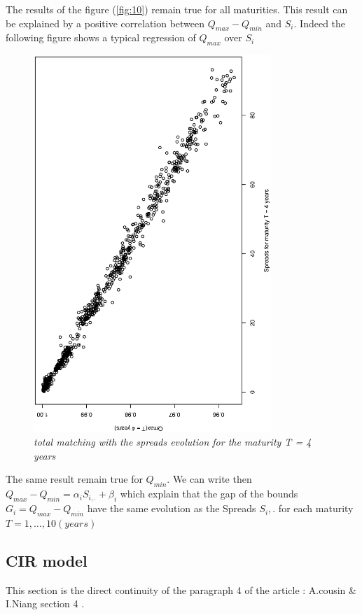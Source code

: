 The results  of the figure (\ref{fig:10})  remain true for all  maturities. This
result can be explained by  a positive correlation between $Q_{max}-Q_{min}$ and
$S_i$. Indeed the following figure shows a typical regression of $Q_{max}$ over $S_i$

\begin{figure}[H]
  \centering
  \includegraphics[angle=-90,width=0.8\textwidth]{corr_T_4}
  \caption{\it total matching with the spreads evolution for the maturity T = 4 years}
  \label{fig:11}
\end{figure}

The   same   result   remain   true   for   $Q_{min}$.   We   can   write   then
$Q_{max}-Q_{min}=\alpha_i  S_{i,.} +  \beta_i$ which  explain  that the  gap of  the
bounds $G_i  = Q_{max}-Q_{min}$ have the  same evolution as the  Spreads $S_i,.$
for each maturity $T=1,\dots,10 (years)$




\subsection{CIR model}
This  section is  the direct  continuity of  the paragraph  4 of  the article  :
A.cousin \& I.Niang section 4 \cite{OTRATS}.\\


